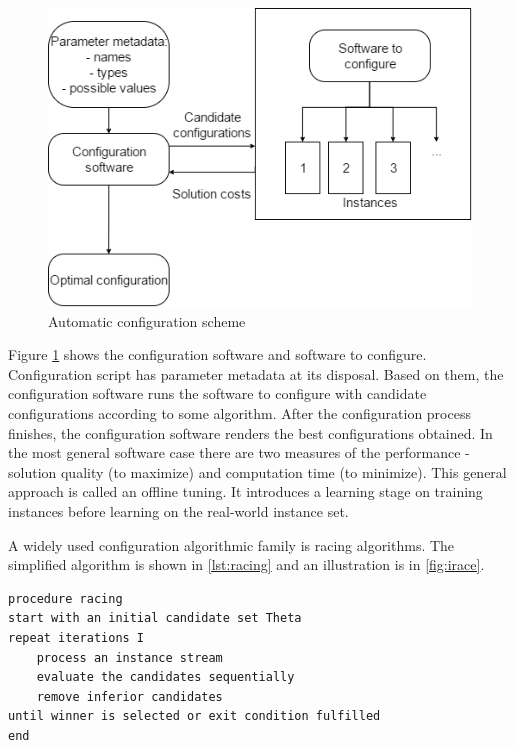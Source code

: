 \documentclass[11pt,a4paper,oneside]{book}
\begin{document}
\begin{figure}
  \centering
    \includegraphics[scale=0.7]{configuration-top-level.png}
  \caption{Automatic configuration scheme}
  \label{fig:autoconf}
\end{figure}

Figure \ref{fig:autoconf} shows the configuration software and software to configure. Configuration script has parameter metadata at its disposal. Based on them, the configuration software runs the software to configure with candidate configurations according to some algorithm. After the configuration process finishes, the configuration software renders the best configurations obtained. In the most general software case there are two measures of the performance - solution quality (to maximize) and computation time (to minimize). This general approach is called an offline tuning. It introduces a learning stage on training instances before learning on the real-world instance set.


A widely used configuration algorithmic family is racing algorithms. The simplified algorithm is shown in \ref{lst:racing} and an illustration is in \ref{fig:irace}.


\begin{minipage}[c, breaklines=true]{0.95\textwidth}
\begin{lstlisting}[caption={General racing pseudo-code}, label={lst:racing}]
procedure racing
start with an initial candidate set Theta
repeat iterations I
	process an instance stream
	evaluate the candidates sequentially
	remove inferior candidates
until winner is selected or exit condition fulfilled
end
\end{lstlisting}
\end{minipage}
\end{document}
